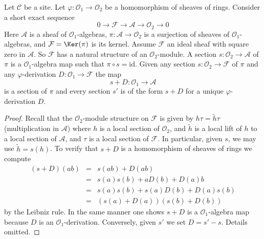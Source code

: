 \begin{lemma}
\label{lemma-double-structure-gives-derivation}
Let $\mathcal{C}$ be a site. Let $\varphi : \mathcal{O}_1 \to \mathcal{O}_2$
be a homomorphism of sheaves of rings.
Consider a short exact sequence
$$
0 \to \mathcal{F} \to \mathcal{A} \to \mathcal{O}_2 \to 0
$$
Here $\mathcal{A}$ is a sheaf of $\mathcal{O}_1$-algebras,
$\pi : \mathcal{A} \to \mathcal{O}_2$ is a surjection
of sheaves of $\mathcal{O}_1$-algebras, and
$\mathcal{F} = \Ker(\pi)$ is its kernel. Assume $\mathcal{F}$ an ideal
sheaf with square zero in $\mathcal{A}$. So $\mathcal{F}$
has a natural structure of an $\mathcal{O}_2$-module.
A section $s : \mathcal{O}_2 \to \mathcal{A}$ of $\pi$
is a $\mathcal{O}_1$-algebra map such that $\pi \circ s = \text{id}$.
Given any section $s : \mathcal{O}_2 \to \mathcal{F}$
of $\pi$ and any $\varphi$-derivation $D : \mathcal{O}_1 \to \mathcal{F}$
the map
$$
s + D : \mathcal{O}_1 \to \mathcal{A}
$$
is a section of $\pi$ and every section $s'$ is of the form $s + D$
for a unique $\varphi$-derivation $D$.
\end{lemma}

\begin{proof}
Recall that the $\mathcal{O}_2$-module structure on $\mathcal{F}$
is given by $h \tau = \tilde h \tau$ (multiplication in $\mathcal{A}$)
where $h$ is a local section of $\mathcal{O}_2$, and
$\tilde h$ is a local lift of $h$ to a local
section of $\mathcal{A}$, and $\tau$ is a local section of $\mathcal{F}$.
In particular, given $s$, we may use $\tilde h = s(h)$.
To verify that $s + D$ is a homomorphism of sheaves of rings we
compute
\begin{eqnarray*}
(s + D)(ab) & = & s(ab) + D(ab) \\
& = & s(a)s(b) + aD(b) + D(a)b \\
& = & s(a) s(b) + s(a)D(b) + D(a)s(b) \\
& = & (s(a) + D(a))(s(b) + D(b))
\end{eqnarray*}
by the Leibniz rule. In the same manner one shows
$s + D$ is a $\mathcal{O}_1$-algebra map because $D$ is
an $\mathcal{O}_1$-derivation. Conversely, given $s'$ we set
$D = s' - s$. Details omitted.
\end{proof}

